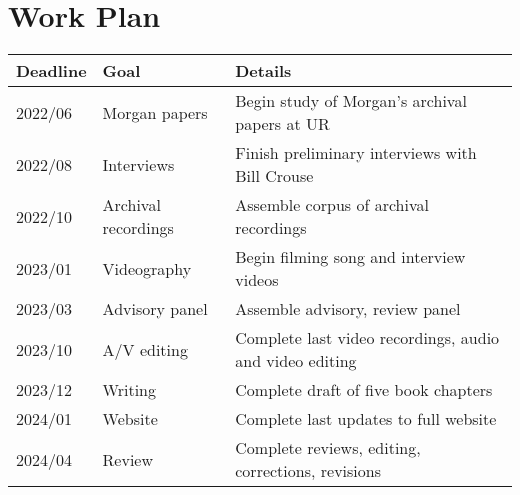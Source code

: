 \documentclass{neh}
\begin{document}
\section{Work Plan}
\begin{tabularx}{\textwidth}{llX}
    \toprule
    Deadline & Goal & Details \\
    \midrule
    2022/06 & Morgan papers & Begin study of Morgan's archival papers at UR \\
    2022/08 & Interviews & Finish preliminary interviews with Bill Crouse \\
    2022/10 & Archival recordings & Assemble corpus of archival recordings \\
    2023/01 & Videography & Begin filming song and interview videos \\
    2023/03 & Advisory panel & Assemble advisory, review panel \\
    2023/10 & A/V editing & Complete last video recordings, audio and video editing \\
    2023/12 & Writing & Complete draft of five book chapters \\
    2024/01 & Website & Complete last updates to full website \\
    2024/04 & Review & Complete reviews, editing, corrections, revisions \\
    \bottomrule
\end{tabularx}
\end{document}
